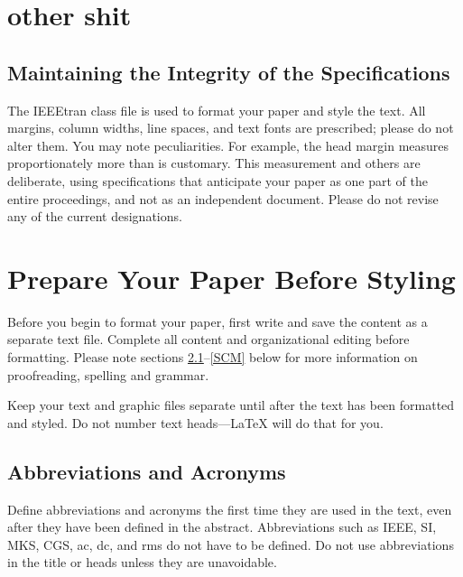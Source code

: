 \documentclass[10pt,a4paper,conference]{IEEEtran}
\begin{document}
\section{other shit}


\subsection{Maintaining the Integrity of the Specifications}

The IEEEtran class file is used to format your paper and style the text. All margins,
column widths, line spaces, and text fonts are prescribed; please do not
alter them. You may note peculiarities. For example, the head margin
measures proportionately more than is customary. This measurement
and others are deliberate, using specifications that anticipate your paper
as one part of the entire proceedings, and not as an independent document.
Please do not revise any of the current designations.

\section{Prepare Your Paper Before Styling}
Before you begin to format your paper, first write and save the content as a
separate text file. Complete all content and organizational editing before
formatting. Please note sections \ref{AA}--\ref{SCM} below for more information on
proofreading, spelling and grammar.

Keep your text and graphic files separate until after the text has been
formatted and styled. Do not number text heads---{\LaTeX} will do that
for you.

\subsection{Abbreviations and Acronyms}\label{AA}
Define abbreviations and acronyms the first time they are used in the text,
even after they have been defined in the abstract. Abbreviations such as
IEEE, SI, MKS, CGS, ac, dc, and rms do not have to be defined. Do not use
abbreviations in the title or heads unless they are unavoidable.
\end{document}
